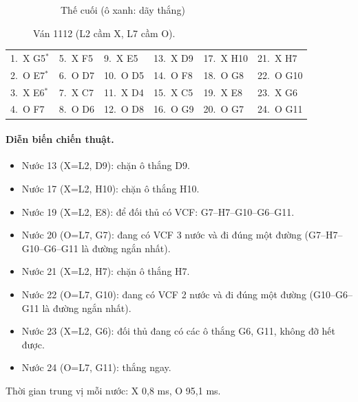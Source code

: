 \begin{figure}[H]
\begin{subfigure}[t]{.48\linewidth}
    \caption{Thế cuối (ô xanh: dãy thắng)}
  \end{subfigure}
  \caption{Ván 1112 (L2 cầm X, L7 cầm O).}
  \label{fig:cs-van-12}
\end{figure}
{\footnotesize\linespread{1}\selectfont
\noindent\begin{tabularx}{\linewidth}{*{6}{X}}
\toprule
1.~X G5$^\ast$ & 5.~X F5 & 9.~X E5 & 13.~X D9 & 17.~X H10 & 21.~X H7 \\
2.~O E7$^\ast$ & 6.~O D7 & 10.~O D5 & 14.~O F8 & 18.~O G8 & 22.~O G10 \\
3.~X E6$^\ast$ & 7.~X C7 & 11.~X D4 & 15.~X C5 & 19.~X E8 & 23.~X G6 \\
4.~O F7 & 8.~O D6 & 12.~O D8 & 16.~O G9 & 20.~O G7 & 24.~O G11 \\
\bottomrule
\end{tabularx}\par}
\paragraph{Diễn biến chiến thuật.}
\begin{itemize}\footnotesize\linespread{1.1}\selectfont
\setlength{\itemsep}{0pt}
  \item Nước 13 (X=L2, D9): chặn ô thắng D9.
  \item Nước 17 (X=L2, H10): chặn ô thắng H10.
  \item Nước 19 (X=L2, E8): để đối thủ có VCF: G7--H7--G10--G6--G11.
  \item Nước 20 (O=L7, G7): đang có VCF 3 nước và đi đúng một đường (G7--H7--G10--G6--G11 là đường ngắn nhất).
  \item Nước 21 (X=L2, H7): chặn ô thắng H7.
  \item Nước 22 (O=L7, G10): đang có VCF 2 nước và đi đúng một đường (G10--G6--G11 là đường ngắn nhất).
  \item Nước 23 (X=L2, G6): đối thủ đang có các ô thắng G6, G11, không đỡ hết được.
  \item Nước 24 (O=L7, G11): thắng ngay.
\end{itemize}
Thời gian trung vị mỗi nước: X 0,8 ms, O 95,1 ms.
\clearpage


